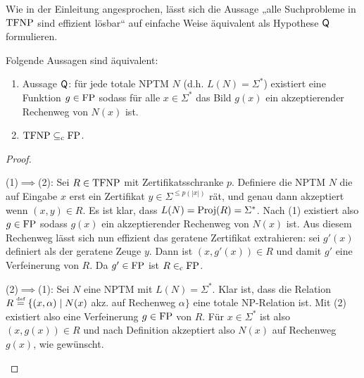 % 
Wie in der Einleitung angesprochen, lässt sich die Aussage „alle Suchprobleme in $\mathrm{TFNP}$ sind effizient lösbar“ auf einfache Weise äquivalent als Hypothese $\mathsf{Q}$ formulieren.
\begin{observation}\label{obs:tfnp-q}
    Folgende Aussagen sind äquivalent:
    \begin{enumerate}
        \item Aussage $\mathsf{Q}$: für jede totale NPTM $N$ (d.h. $L(N)=\Sigma^*$) existiert eine Funktion $g\in\mathrm{FP}$ sodass für alle $x\in\Sigma^*$ das Bild $g(x)$ ein akzeptierender Rechenweg von $N(x)$ ist. 
        \item $\mathrm{TFNP}\subseteq_\mathrm{c} \mathrm{FP}$.
    \end{enumerate}
\end{observation}
\begin{proof}
\begin{prooflist}
\item (1)$\implies$(2): Sei $R\in\mathrm{TFNP}$ mit Zertifikatsschranke $p$. Definiere die NPTM $N$ die auf Eingabe $x$ erst ein Zertifikat $y\in\Sigma^{\leq p(|x|)}$ rät, und genau dann akzeptiert wenn $(x,y)\in R$. Es ist klar, dass $L(N)=\operatorname{Proj}(R)=\Sigma^*$. Nach (1) existiert also $g\in\mathrm{FP}$ sodass $g(x)$ ein akzeptierender Rechenweg von $N(x)$ ist. Aus diesem Rechenweg lässt sich nun effizient das geratene Zertifikat extrahieren: sei $g'(x)$ definiert als der geratene Zeuge $y$. Dann ist $(x,g'(x))\in R$ und damit $g'$ eine Verfeinerung von $R$. Da $g'\in\mathrm{FP}$ ist $R\in_\mathrm{c}\mathrm{FP}$.

\item (2)$\implies$(1): Sei $N$ eine NPTM mit $L(N)=\Sigma^*$. Klar ist, dass die Relation $R\stackrel{\text{{\normalfont\tiny def}}}{=} \{ (x,\alpha) \mid N(x)$ akz. auf Rechenweg $\alpha\}$ eine totale NP-Relation ist.
    Mit (2) existiert also eine Verfeinerung $g\in\mathrm{FP}$ von $R$. Für $x\in\Sigma^*$ ist also $(x, g(x))\in R$ und nach Definition akzeptiert also $N(x)$ auf Rechenweg $g(x)$, wie gewünscht.
\end{prooflist}
\end{proof}

